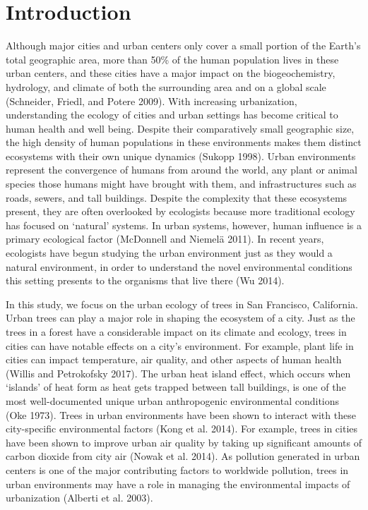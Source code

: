 \documentclass[fleqn,10pt,lineno]{wlpeerj} %
\begin{document}
\hypertarget{introduction}{%
\section*{Introduction}\label{introduction}}

Although major cities and urban centers only cover a small portion of the Earth's total geographic area, more than 50\% of the human population lives in these urban centers, and these cities have a major impact on the biogeochemistry, hydrology, and climate of both the surrounding area and on a global scale (Schneider, Friedl, and Potere 2009). With increasing urbanization, understanding the ecology of cities and urban settings has become critical to human health and well being. Despite their comparatively small geographic size, the high density of human populations in these environments makes them distinct ecosystems with their own unique dynamics (Sukopp 1998). Urban environments represent the convergence of humans from around the world, any plant or animal species those humans might have brought with them, and infrastructures such as roads, sewers, and tall buildings. Despite the complexity that these ecosystems present, they are often overlooked by ecologists because more traditional ecology has focused on `natural' systems. In urban systems, however, human influence is a primary ecological factor (McDonnell and Niemelä 2011). In recent years, ecologists have begun studying the urban environment just as they would a natural environment, in order to understand the novel environmental conditions this setting presents to the organisms that live there (Wu 2014).

In this study, we focus on the urban ecology of trees in San Francisco, California. Urban trees can play a major role in shaping the ecosystem of a city. Just as the trees in a forest have a considerable impact on its climate and ecology, trees in cities can have notable effects on a city's environment. For example, plant life in cities can impact temperature, air quality, and other aspects of human health (Willis and Petrokofsky 2017). The urban heat island effect, which occurs when `islands' of heat form as heat gets trapped between tall buildings, is one of the most well-documented unique urban anthropogenic environmental conditions (Oke 1973). Trees in urban environments have been shown to interact with these city-specific environmental factors (Kong et al. 2014). For example, trees in cities have been shown to improve urban air quality by taking up significant amounts of carbon dioxide from city air (Nowak et al. 2014). As pollution generated in urban centers is one of the major contributing factors to worldwide pollution, trees in urban environments may have a role in managing the environmental impacts of urbanization (Alberti et al. 2003).
\end{document}
